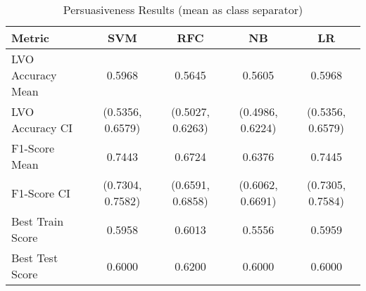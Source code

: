 \begin{table}[h!]
\centering
\begin{tabular}{|l|c|c|c|c|}
\hline
\textbf{Metric}           & \textbf{SVM}    & \textbf{RFC}    & \textbf{NB}     & \textbf{LR}     \\ \hline
LVO Accuracy Mean         & 0.5968          & 0.5645          & 0.5605          & 0.5968          \\ \hline
LVO Accuracy CI           & (0.5356, 0.6579)& (0.5027, 0.6263)& (0.4986, 0.6224)& (0.5356, 0.6579)\\ \hline
F1-Score Mean             & 0.7443          & 0.6724          & 0.6376          & 0.7445          \\ \hline
F1-Score CI               & (0.7304, 0.7582)& (0.6591, 0.6858)& (0.6062, 0.6691)& (0.7305, 0.7584)\\ \hline
Best Train Score          & 0.5958          & 0.6013          & 0.5556          & 0.5959          \\ \hline
Best Test Score           & 0.6000          & 0.6200          & 0.6000          & 0.6000          \\ \hline
\end{tabular}
\caption{Persuasiveness Results (mean as class separator)}
\label{table:persuasiveness}
\end{table}
